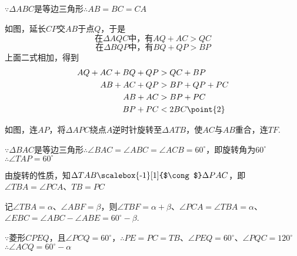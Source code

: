 \documentclass[10pt]{article}
\begin{document}
\begin{questions}{\answeringintroduction}
\begin{subquestions}
\begin{figure}[!htb]
        \end{figure}
    \end{subquestions}
    \question %
    \begin{subquestions}
        \subquestion $\because \Delta ABC$是等边三角形$\therefore AB=BC=CA$ \par
        如图，延长$CP$交$AB$于点$Q$，于是
        $$在\Delta AQC中，有AQ+AC>QC$$
        $$在\Delta BQP中，有BQ+QP>BP$$
        上面二式相加，得到
        $$\begin{aligned}
            AQ+AC+BQ+QP &> QC+BP \\
            AB+AC+QP &> BP+QP+PC \\
            AB+AC &> BP+PC \\
            BP+PC &< 2BC \point{2}
        \end{aligned}$$
        \begin{figure}[!htb]
            \raggedleft
        \end{figure}\newpage
        \subquestion
        如图，连$AP$，将$\Delta APC$绕点$A$逆时针旋转至$\Delta ATB$，使$AC$与$AB$重合，连$TF$. \par
        $\because \Delta BAC$是等边三角形$\therefore \angle BAC=\angle ABC=\angle ACB=60^{\circ}$，即旋转角为$60^{\circ}$$\therefore \angle TAP=60^{\circ}$ \par
        由旋转的性质，知$\Delta TAB \text{\scalebox{-1}[1]{$\cong$}} \Delta PAC$，即$\angle TBA=\angle PCA$、$TB=PC$  \par
        记$\angle TBA=\alpha$、$\angle ABF=\beta$，则$\angle TBF=\alpha+\beta$、$\angle PCA=\angle TBA=\alpha$、$\angle EBC=\angle ABC-\angle ABE=60^{\circ}-\beta$. \par
        $\because 菱形CPEQ，且\angle PCQ=60^{\circ}$，$\therefore PE=PC=TB$、$\angle PEQ=60^{\circ}$、$\angle PQC=120^{\circ}$$\therefore \angle ACQ=60^{\circ}-\alpha$ \par

\end{subquestions}
\end{questions}
\end{document}
